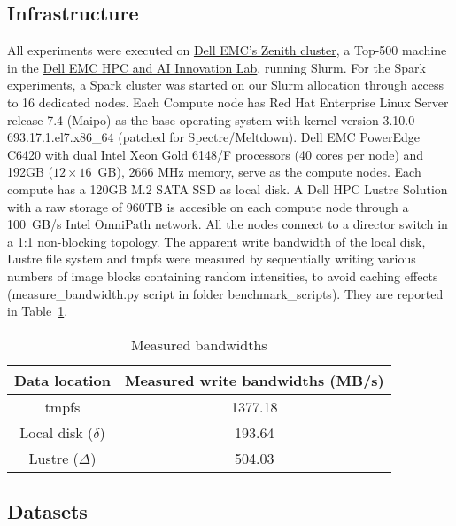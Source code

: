 \documentclass{IEEEtran}
\begin{document}

\subsection{Infrastructure} %

 All experiments were executed on 
 \href{https://www.dellemc.com/resources/en-us/asset/sales-documents/products/storage/h16221-hpc-lab-brochure.pdf}{Dell 
 EMC's Zenith cluster}, a Top-500 machine in the 
 \href{https://www.dellemc.com/en-us/solutions/high-performance-computing/HPC-AI-Innovation-Lab.htm}{Dell 
 EMC HPC and AI Innovation Lab}, running Slurm. For the Spark 
 experiments, a Spark cluster was started on our 
 Slurm allocation through access to 16 dedicated nodes.
 Each Compute node has Red Hat Enterprise Linux Server release 7.4 (Maipo) 
 as the base operating system with kernel version 3.10.0-693.17.1.el7.x86\_64
 (patched for Spectre/Meltdown). Dell EMC PowerEdge C6420 with dual Intel Xeon
 Gold 6148/F processors (40 cores per node) and 192GB ($12\times16$~GB), 2666 MHz
 memory, serve as the compute nodes. Each compute has a 120GB M.2 SATA SSD as 
 local disk. A Dell HPC Lustre Solution with a raw storage of 960TB is 
 accesible on each compute node through a 100~GB/s Intel OmniPath network. All
 the nodes connect to a director switch in a 1:1 non-blocking topology.
 The apparent write bandwidth of the local disk, 
 Lustre file system and tmpfs were measured by sequentially writing various numbers
 of image blocks containing random intensities, to avoid 
 caching effects (measure\_bandwidth.py script in folder 
 benchmark\_scripts). They are reported in Table~\ref{table:bdwdths}.

\begin{table}
\centering
\begin{tabular}{c|c}
\rowcolor{headcolor}
Data location & Measured write bandwidths (MB/s)\\
\hline
tmpfs                 & 1377.18 \\
Local disk ($\delta$) & 193.64  \\
Lustre   ($\Delta$)   & 504.03 \\
\end{tabular}
\caption{Measured bandwidths}
\label{table:bdwdths}
\end{table}

\subsection{Datasets} %
\end{document}
